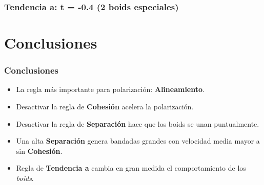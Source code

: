 \documentclass{beamer}
\begin{document}
        \begin{frame}[standout]
            \frametitle{Tendencia a: t = -0.4 (2 boids especiales)}
        \end{frame}
    \section{Conclusiones}
    \begin{frame}
        \frametitle{Conclusiones}
        \begin{itemize}
            \item La regla más importante para polarización: \textbf{Alineamiento}.
            \item Desactivar la regla de \textbf{Cohesión} acelera la polarización.
            \item Desactivar la regla de \textbf{Separación} hace que los boids se unan puntualmente.
            \item Una alta \textbf{Separación} genera bandadas grandes con velocidad media mayor a sin \textbf{Cohesión}.
            \item Regla de \textbf{Tendencia a} cambia en gran medida el comportamiento de los \textit{boids}.
        \end{itemize}
    \end{frame}
    
\end{document}

